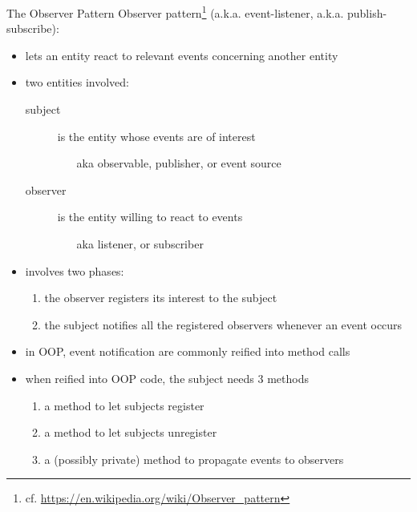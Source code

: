 \documentclass[presentation]{beamer}
\begin{document}
\begin{frame}[allowframebreaks]{The Observer Pattern}
  Observer pattern\footnote{cf. \url{https://en.wikipedia.org/wiki/Observer_pattern}} (a.k.a. event-listener, a.k.a. publish-subscribe):
  \begin{itemize}
    \item lets an entity \alert{react} to relevant events concerning another entity

    \item two entities involved: 
    \begin{description}
      \item[subject] is the entity whose events are of interest
      \begin{itemize}
        \item[aka] observable,  publisher, or event source
      \end{itemize} 

      \item[observer] is the entity willing to react to events
      \begin{itemize}
        \item[aka] listener, or subscriber
      \end{itemize} 
    \end{description}

    \item involves two phases:
    \begin{enumerate}
      \item the observer registers its interest to the subject
      \item the subject notifies all the registered observers whenever an event occurs
    \end{enumerate}

    \framebreak

    \item in OOP, event notification are commonly reified into method calls

    \item when reified into OOP code, the subject needs 3 methods
    \begin{enumerate}
      \item a method to let subjects register
      \item a method to let subjects unregister
      \item a (possibly private) method to propagate events to observers
    \end{enumerate}


\end{itemize}
\end{frame}
\end{document}
